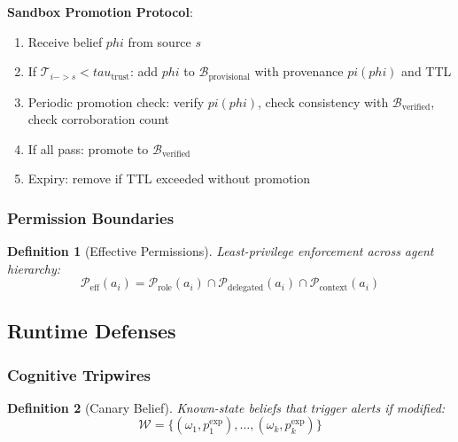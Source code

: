 \documentclass[
]{article}
\newtheorem{definition}{Definition}[section]
\begin{document}
\textbf{Sandbox Promotion Protocol}:

\begin{enumerate}
\item Receive belief $phi$ from source $s$
\item If $\mathcal{T}_{i -> s} < tau_{\text{trust}}$: add $phi$ to $\mathcal{B}_{\text{provisional}}$ with provenance $pi(phi)$ and TTL
\item Periodic promotion check: verify $pi(phi)$, check consistency with $\mathcal{B}_{\text{verified}}$, check corroboration count
\item If all pass: promote to $\mathcal{B}_{\text{verified}}$
\item Expiry: remove if TTL exceeded without promotion
\end{enumerate}

\subsubsection{Permission Boundaries}\label{permission-boundaries}

\begin{definition}[Effective Permissions]
\label{def:effective-perms}
Least-privilege enforcement across agent hierarchy:
\begin{equation}
\label{eq:effective-perms}
\mathcal{P}_{\text{eff}}(a_i) = \mathcal{P}_{\text{role}}(a_i) \cap \mathcal{P}_{\text{delegated}}(a_i) \cap \mathcal{P}_{\text{context}}(a_i)
\end{equation}
\end{definition}

\subsection{Runtime Defenses}\label{sec:runtime-defenses}

\subsubsection{Cognitive Tripwires}\label{cognitive-tripwires}

\begin{definition}[Canary Belief]
\label{def:canary}
Known-state beliefs that trigger alerts if modified:
\begin{equation}
\label{eq:canary-set}
\mathcal{W} = \{(\omega_1, p_1^{\text{exp}}), \ldots, (\omega_k, p_k^{\text{exp}})\}
\end{equation}
\end{definition}
\end{document}
